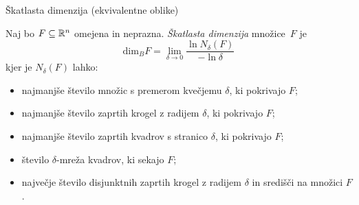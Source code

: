 \documentclass[10pt]{beamer}
\begin{document}

\begin{frame}[t]{Škatlasta dimenzija (ekvivalentne oblike)}  
    \begin{definicija}
        Naj bo \(F \subseteq \mathbb{R}^n\) omejena in neprazna. \emph{Škatlasta dimenzija} množice~\(F\) je 
        \[\text{dim}_B F = \lim_{\delta \to 0} \frac{\ln N_\delta(F)}{-\ln \delta}\]
        kjer je \(N_\delta(F)\) lahko:
        \begin{itemize}
            \item najmanjše število množic s premerom kvečjemu \(\delta\), ki pokrivajo \(F\);
            \item najmanjše število zaprtih krogel z radijem \(\delta\), ki pokrivajo \(F\);
            \item najmanjše število zaprtih kvadrov s stranico \(\delta\), ki pokrivajo \(F\);
            \item število \(\delta\)-mreža kvadrov, ki sekajo \(F\);
            \item največje število disjunktnih zaprtih krogel z radijem \(\delta\) in središči na množici \(F\).
        \end{itemize}
    \end{definicija}
\end{frame}

        
\end{document}
